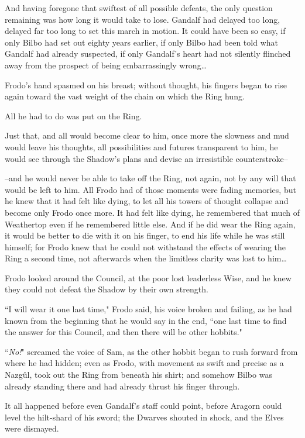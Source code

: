 And having foregone that swiftest of all possible defeats, the only question remaining was how long it would take to lose. Gandalf had delayed too long, delayed far too long to set this march in motion. It could have been so easy, if only Bilbo had set out eighty years earlier, if only Bilbo had been told what Gandalf had already suspected, if only Gandalf's heart had not silently flinched away from the prospect of being embarrassingly wrong{\ldots}

Frodo's hand spasmed on his breast; without thought, his fingers began to rise again toward the vast weight of the chain on which the Ring hung.

All he had to do was put on the Ring.

Just that, and all would become clear to him, once more the slowness and mud would leave his thoughts, all possibilities and futures transparent to him, he would see through the Shadow's plans and devise an irresistible counterstroke\---

\---and he would never be able to take off the Ring, not again, not by any will that would be left to him. All Frodo had of those moments were fading memories, but he knew that it had felt like dying, to let all his towers of thought collapse and become only Frodo once more. It had felt like dying, he remembered that much of Weathertop even if he remembered little else. And if he did wear the Ring again, it would be better to die with it on his finger, to end his life while he was still himself; for Frodo knew that he could not withstand the effects of wearing the Ring a second time, not afterwards when the limitless clarity was lost to him{\ldots}

Frodo looked around the Council, at the poor lost leaderless Wise, and he knew they could not defeat the Shadow by their own strength.

``I will wear it one last time," Frodo said, his voice broken and failing, as he had known from the beginning that he would say in the end, ``one last time to find the answer for this Council, and then there will be other hobbits."

``\emph{No!}" screamed the voice of Sam, as the other hobbit began to rush forward from where he had hidden; even as Frodo, with movement as swift and precise as a Nazgûl, took out the Ring from beneath his shirt; and somehow Bilbo was already standing there and had already thrust his finger through.

It all happened before even Gandalf's staff could point, before Aragorn could level the hilt-shard of his sword; the Dwarves shouted in shock, and the Elves were dismayed.

